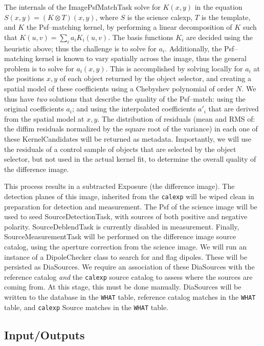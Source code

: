 \documentclass[12pt]{article}
\begin{document}
The internals of the ImagePsfMatchTask solve for $K(x,y)$ in the
equation $S(x,y) = (K \otimes T)(x,y)$, where $S$ is the science
calexp, $T$ is the template, and $K$ the Psf--matching kernel, by
performing a linear decomposition of $K$ such that $K(u,v) = \sum_i
a_i K_i(u,v)$.  The basis functions $K_i$ are decided using the
heuristic above; thus the challenge is to solve for $a_i$.
Additionally, the Psf--matching kernel is known to vary spatially
across the image, thus the general problem is to solve for $a_i(x,y)$.
This is accomplished by solving locally for $a_i$ at the positions
$x,y$ of each object returned by the object selector, and creating a
spatial model of these coefficients using a Chebyshev polynomial of
order $N$.  We thus have {\it two} solutions that describe the quality
of the Psf--match: using the original coefficients $a_i$; and using
the interpolated coefficients $a{'}_i$ that are derived from the
spatial model at $x,y$.  The distribution of residuals (mean and RMS
of: the diffim residuals normalized by the square root of the
variance) in each one of these KernelCandidates will be returned as
metadata.  Importantly, we will use the residuals of a control sample
of objects that are selected by the object selector, but not used in
the actual kernel fit, to determine the overall quality of the
difference image.

This process results in a subtracted Exposure (the difference image).
The detection planes of this image, inherited from the {\tt calexp}
will be wiped clean in preparation for detection and measurement.  The
Psf of the science image will be used to seed SourceDetectionTask,
with sources of both positive and negative polarity.
SourceDeblendTask is currently disabled in measurement.  Finally,
SourceMeasurementTask will be performed on the difference image source
catalog, using the aperture correction from the science image.  We
will run an instance of a DipoleChecker class to search for and flag
dipoles.  These will be persisted as DiaSources.  We require an
association of these DiaSources with the reference catalog {\it and}
the {\tt calexp} source catalog to assess where the sources are coming
from.  At this stage, this must be done manually.  DiaSources will be
written to the database in the {\tt WHAT} table, reference catalog
matches in the {\tt WHAT} table, and {\tt calexp} Source matches in
the {\tt WHAT} table.

\subsection{Input/Outputs}
\end{document}
